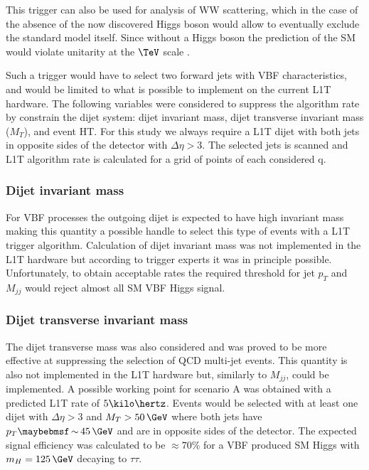 This trigger can also be used for analysis of WW scattering, which in the case of the absence of the now discovered Higgs boson would allow to eventually exclude the standard model itself. Since without a Higgs boson the prediction of the \gls{SM} would violate unitarity at the $\TeV$ scale \cite{BOOK:PerspectivesonHiggsPhysicsII}.

Such a trigger would have to select two forward jets with \gls{VBF} characteristics, and would be limited to what is possible to implement on the current \gls{L1T} hardware. The following variables were considered to suppress the algorithm rate by constrain the dijet system: dijet invariant mass, dijet transverse invariant mass ($M_{T}$), and event \gls{HT}. For this study we always require a \gls{L1T} dijet with both jets in opposite sides of the detector with $\Delta\eta>3$. The selected jets \pt is scanned and \gls{L1T} algorithm rate is calculated for a grid of points of each considered q.

\subsubsection{Dijet invariant mass}


For \gls{VBF} processes the outgoing dijet is expected to have high invariant mass making this quantity a possible handle to select this type of events with a \gls{L1T} trigger algorithm. Calculation of dijet invariant mass was not implemented in the \gls{L1T} hardware but according to trigger experts it was in principle possible. Unfortunately, to obtain acceptable rates the required threshold for jet $p_T$ and $M_{jj}$ would reject almost all \gls{SM} \gls{VBF} Higgs signal.

\subsubsection{Dijet transverse invariant mass}


The dijet transverse mass was also considered and was proved to be more effective at suppressing the selection of \gls{QCD} multi-jet events. This quantity is also not implemented in the \gls{L1T} hardware but, similarly to $M_{jj}$, could be implemented. A possible working point for scenario A was obtained with a predicted \gls{L1T} rate of $5\kilo\hertz$. Events would be selected with at least one dijet with $\Delta\eta>3$ and $M_T>50\,\GeV$ where both jets have $p_T \sim 45\,\GeV$ and are in opposite sides of the detector. The expected signal efficiency was calculated to be $\approx 70\%$ for a \gls{VBF} produced \gls{SM} Higgs with $m_H=125\,\GeV$ decaying to $\tau\tau$.

